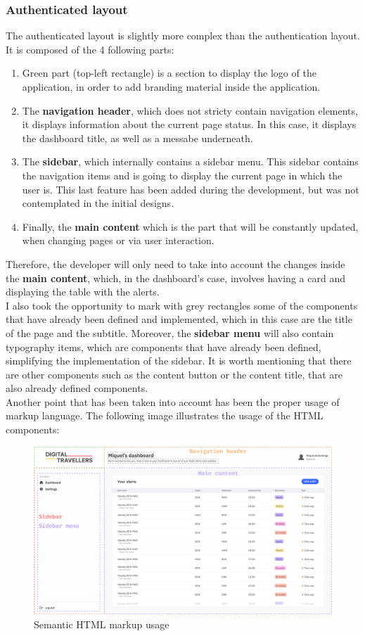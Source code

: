 \documentclass[./memory.tex]{subfiles}
\begin{document}
\subsubsection{Authenticated layout}
The authenticated layout is slightly more complex than the authentication
layout. It is composed of the 4 following parts:
\begin{enumerate}[label = -]
	\item Green part (top-left rectangle) is a section to display the logo of the
	      application, in order to add branding material inside the application.
	\item The \textbf{navigation header}, which does not stricty contain
	      navigation elements, it displays information about the current page status.
	      In this case, it displays the dashboard title, as well as a messabe
	      underneath.
	\item The \textbf{sidebar}, which internally contains a sidebar menu. This
	      sidebar contains the navigation items and is going to display the current
	      page in which the user is. This last feature has been added during the
	      development, but was not contemplated in the initial designs.
	\item Finally, the \textbf{main content} which is the part that will be
	      constantly updated, when changing pages or via user interaction.
\end{enumerate}
Therefore, the developer will only need to take into account the changes inside
the \textbf{main content}, which, in the dashboard's case, involves having a
card and displaying the table with the alerts.
\\[8pt]
I also took the opportunity to mark with grey rectangles some of the components
that have already been defined and implemented, which in this case are the title
of the page and the subtitle. Moreover, the \textbf{sidebar menu} will also
contain typography items, which are components that have already been defined,
simplifying the implementation of the sidebar. It is worth mentioning that there
are other components such as the content button or the content title, that are
also already defined components.
\\[8pt]
Another point that has been taken into account has been the proper usage of
markup language. The following image illustrates the usage of the HTML
components:
\begin{figure}[H]
	\centering
	\includegraphics[width=\textwidth]{./assets/designs/dashboard-layout-web.png}
	\caption{Semantic HTML markup usage}
\end{figure}
\end{document}
